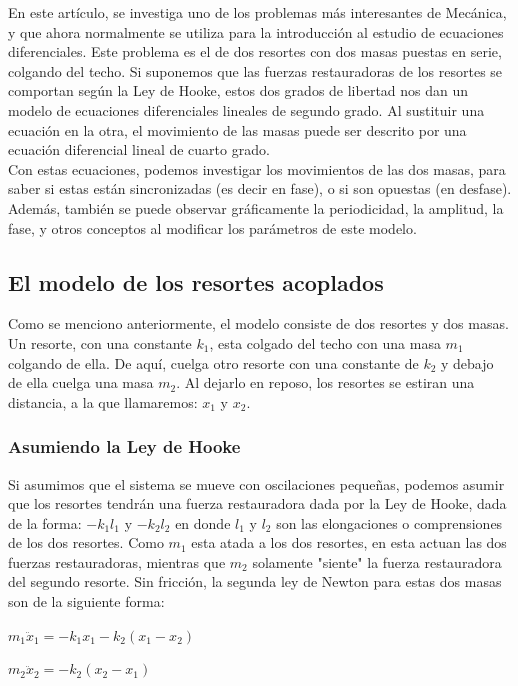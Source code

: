 \documentclass[12pt]{article}
\begin{document}
En este artículo, se investiga uno de los problemas más interesantes de Mecánica, y que ahora normalmente se utiliza para la introducción al estudio de ecuaciones diferenciales. Este problema es el de dos resortes con dos masas puestas en serie, colgando del techo. Si suponemos que las fuerzas restauradoras de los resortes se comportan según la Ley de Hooke, estos dos grados de libertad nos dan un modelo de ecuaciones diferenciales lineales de segundo grado. Al sustituir una ecuación en la otra, el movimiento de las masas puede ser descrito por una ecuación diferencial lineal de cuarto grado.\\

Con estas ecuaciones, podemos investigar los movimientos de las dos masas, para saber si estas están sincronizadas (es decir en fase), o si son opuestas (en desfase). Además, también se puede observar gráficamente la periodicidad, la amplitud, la fase, y otros conceptos al modificar los parámetros de este modelo. 

\subsection{El modelo de los resortes acoplados}
Como se menciono anteriormente, el modelo consiste de dos resortes y dos masas. Un resorte, con una constante $k_1$, esta colgado del techo con una masa $m_1$ colgando de ella. De aquí, cuelga otro resorte con una constante de $k_2$ y debajo de ella cuelga una masa $m_2$.  Al dejarlo en reposo, los resortes se estiran una distancia, a la que llamaremos: $x_1$ y $x_2$. \\

\subsubsection{Asumiendo la Ley de Hooke}
Si asumimos que el sistema se mueve con oscilaciones pequeñas, podemos asumir que los resortes tendrán una fuerza restauradora dada por la Ley de Hooke, dada de la forma: $-k_1l_1$ y $-k_2l_2$ en donde $l_1$ y $l_2$ son las elongaciones o comprensiones de los dos resortes. Como $m_1$ esta atada a los dos resortes, en esta actuan las dos fuerzas restauradoras, mientras que $m_2$ solamente "siente" la fuerza restauradora del segundo resorte. Sin fricción, la segunda ley de Newton para estas dos masas son de la siguiente forma: \\

\centerline{$m_1 \ddot x_1 = -k_1x_1 - k_2(x_1-x_2)$}
\centerline{$m_2 \ddot x_2 = -k_2(x_2-x_1)$}
$    $
\end{document}
